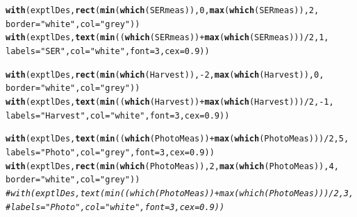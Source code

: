 \documentclass[11pt, oneside]{article}\usepackage[]{graphicx}\usepackage[]{color}
\makeatletter
\newcommand{\hlnum}[1]{\textcolor[rgb]{0.686,0.059,0.569}{#1}}%
\newcommand{\hlstr}[1]{\textcolor[rgb]{0.192,0.494,0.8}{#1}}%
\newcommand{\hlcom}[1]{\textcolor[rgb]{0.678,0.584,0.686}{\textit{#1}}}%
\newcommand{\hlopt}[1]{\textcolor[rgb]{0,0,0}{#1}}%
\newcommand{\hlstd}[1]{\textcolor[rgb]{0.345,0.345,0.345}{#1}}%
\newcommand{\hlkwc}[1]{\textcolor[rgb]{0.333,0.667,0.333}{#1}}%
\newcommand{\hlkwd}[1]{\textcolor[rgb]{0.737,0.353,0.396}{\textbf{#1}}}%
\newenvironment{kframe}{%
 \def\at@end@of@kframe{}%
 \ifinner\ifhmode%
  \def\at@end@of@kframe{\end{minipage}}%
  \begin{minipage}{\columnwidth}%
 \fi\fi%
 \def\FrameCommand##1{\hskip\@totalleftmargin \hskip-\fboxsep
 \colorbox{shadecolor}{##1}\hskip-\fboxsep
     \hskip-\linewidth \hskip-\@totalleftmargin \hskip\columnwidth}%
 \MakeFramed {\advance\hsize-\width
   \@totalleftmargin\z@ \linewidth\hsize
   \@setminipage}}%
 {\par\unskip\endMakeFramed%
 \at@end@of@kframe}
\newenvironment{knitrout}{}{} %
\makeatother
\begin{document}
\begin{knitrout}
\begin{kframe}
\begin{alltt}
\hlkwd{with}\hlstd{(exptlDes,} \hlkwd{rect}\hlstd{(}\hlkwd{min}\hlstd{(}\hlkwd{which}\hlstd{(SERmeas)),} \hlnum{0}\hlstd{,} \hlkwd{max}\hlstd{(}\hlkwd{which}\hlstd{(SERmeas)),} \hlnum{2}\hlstd{,}
        \hlkwc{border} \hlstd{=} \hlstr{"white"}\hlstd{,} \hlkwc{col} \hlstd{=} \hlstr{"grey"}\hlstd{))}
\hlkwd{with}\hlstd{(exptlDes,} \hlkwd{text}\hlstd{(}\hlkwd{min}\hlstd{((}\hlkwd{which}\hlstd{(SERmeas))} \hlopt{+} \hlkwd{max}\hlstd{(}\hlkwd{which}\hlstd{(SERmeas)))} \hlopt{/} \hlnum{2}\hlstd{,} \hlnum{1}\hlstd{,}
        \hlkwc{labels} \hlstd{=} \hlstr{"SER"}\hlstd{,} \hlkwc{col} \hlstd{=} \hlstr{"white"}\hlstd{,} \hlkwc{font} \hlstd{=} \hlnum{3}\hlstd{,} \hlkwc{cex} \hlstd{=} \hlnum{0.9}\hlstd{))}

\hlkwd{with}\hlstd{(exptlDes,} \hlkwd{rect}\hlstd{(}\hlkwd{min}\hlstd{(}\hlkwd{which}\hlstd{(Harvest)),} \hlopt{-}\hlnum{2}\hlstd{,} \hlkwd{max}\hlstd{(}\hlkwd{which}\hlstd{(Harvest)),} \hlnum{0}\hlstd{,}
        \hlkwc{border} \hlstd{=} \hlstr{"white"}\hlstd{,} \hlkwc{col} \hlstd{=} \hlstr{"grey"}\hlstd{))}
\hlkwd{with}\hlstd{(exptlDes,} \hlkwd{text}\hlstd{(}\hlkwd{min}\hlstd{((}\hlkwd{which}\hlstd{(Harvest))} \hlopt{+} \hlkwd{max}\hlstd{(}\hlkwd{which}\hlstd{(Harvest)))} \hlopt{/} \hlnum{2}\hlstd{,} \hlopt{-}\hlnum{1}\hlstd{,}
        \hlkwc{labels} \hlstd{=} \hlstr{"Harvest"}\hlstd{,} \hlkwc{col} \hlstd{=} \hlstr{"white"}\hlstd{,} \hlkwc{font} \hlstd{=} \hlnum{3}\hlstd{,} \hlkwc{cex} \hlstd{=} \hlnum{0.9}\hlstd{))}

\hlkwd{with}\hlstd{(exptlDes,} \hlkwd{text}\hlstd{(}\hlkwd{min}\hlstd{((}\hlkwd{which}\hlstd{(PhotoMeas))} \hlopt{+} \hlkwd{max}\hlstd{(}\hlkwd{which}\hlstd{(PhotoMeas)))} \hlopt{/} \hlnum{2}\hlstd{,} \hlnum{5}\hlstd{,}
        \hlkwc{labels} \hlstd{=} \hlstr{"Photo"}\hlstd{,} \hlkwc{col} \hlstd{=} \hlstr{"grey"}\hlstd{,} \hlkwc{font} \hlstd{=} \hlnum{3}\hlstd{,} \hlkwc{cex} \hlstd{=} \hlnum{0.9}\hlstd{))}
\hlkwd{with}\hlstd{(exptlDes,} \hlkwd{rect}\hlstd{(}\hlkwd{min}\hlstd{(}\hlkwd{which}\hlstd{(PhotoMeas)),} \hlnum{2}\hlstd{,} \hlkwd{max}\hlstd{(}\hlkwd{which}\hlstd{(PhotoMeas)),} \hlnum{4}\hlstd{,}
        \hlkwc{border} \hlstd{=} \hlstr{"white"}\hlstd{,} \hlkwc{col} \hlstd{=} \hlstr{"grey"}\hlstd{))}
\hlcom{#with(exptlDes, text(min((which(PhotoMeas)) + max(which(PhotoMeas))) / 2, 3, }
\hlcom{#	labels = "Photo", col = "white", font = 3, cex = 0.9))}


\end{alltt}
\end{kframe}
\end{knitrout}
\end{document}
